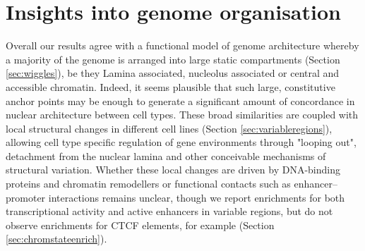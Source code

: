\documentclass[a4paper,11pt,oneside]{book}
\begin{document}


\section{Insights into genome organisation}


Overall our results agree with a functional model of genome architecture whereby a majority of the genome is arranged into large static compartments (Section \ref{sec:wiggles}), be they Lamina associated, nucleolus associated or central and accessible chromatin. Indeed, it seems plausible that such large, constitutive anchor points may be enough to generate a significant amount of concordance in nuclear architecture between cell types.\cite{Bouwman2015a} These broad similarities are coupled with local structural changes in different cell lines (Section \ref{sec:variableregions}), allowing cell type specific regulation of gene environments through "looping out", detachment from the nuclear lamina and other conceivable mechanisms of structural variation. Whether these local changes are driven by DNA-binding proteins and chromatin remodellers or functional contacts such as enhancer--promoter interactions remains unclear, though we report enrichments for both transcriptional activity and active enhancers in variable regions, but do not observe enrichments for CTCF elements, for example (Section \ref{sec:chromstateenrich}).
\end{document}

